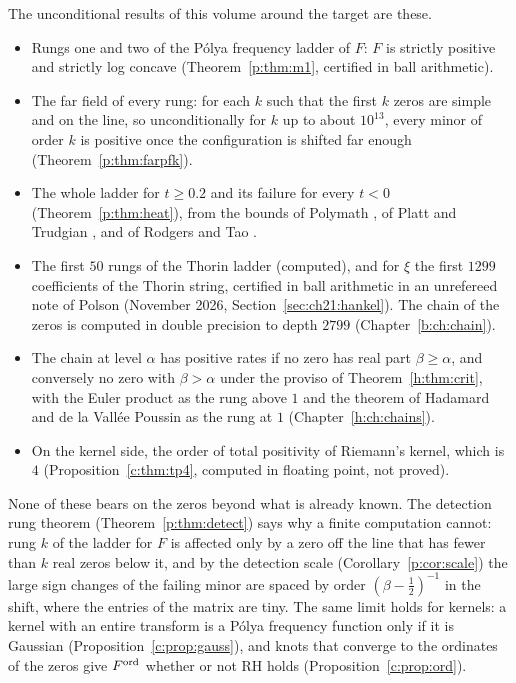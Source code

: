The unconditional results of this volume around the target are these.
\begin{itemize}
\item Rungs one and two of the P\'olya frequency ladder of $F$: $F$ is strictly positive and strictly log concave (Theorem~\ref{p:thm:m1}, certified in ball arithmetic).
\item The far field of every rung: for each $k$ such that the first $k$ zeros are simple and on the line, so unconditionally for $k$ up to about $10^{13}$, every minor of order $k$ is positive once the configuration is shifted far enough (Theorem~\ref{p:thm:farpfk}).
\item The whole ladder for $t\ge0.2$ and its failure for every $t<0$ (Theorem~\ref{p:thm:heat}), from the bounds of Polymath \cite{Polymath}, of Platt and Trudgian \cite{PT21}, and of Rodgers and Tao \cite{RodgersTao}.
\item The first $50$ rungs of the Thorin ladder (computed), and for $\xi$ the first $1299$ coefficients of the Thorin string, certified in ball arithmetic in an unrefereed note of Polson (November 2026, Section~\ref{sec:ch21:hankel}). The chain of the zeros is computed in double precision to depth $2799$ (Chapter~\ref{b:ch:chain}).
\item The chain at level $\alpha$ has positive rates if no zero has real part $\beta\ge\alpha$, and conversely no zero with $\beta>\alpha$ under the proviso of Theorem~\ref{h:thm:crit}, with the Euler product as the rung above $1$ and the theorem of Hadamard and de la Vall\'ee Poussin as the rung at $1$ (Chapter~\ref{h:ch:chains}).
\item On the kernel side, the order of total positivity of Riemann's kernel, which is $4$ (Proposition~\ref{c:thm:tp4}, computed in floating point, not proved).
\end{itemize}
None of these bears on the zeros beyond what is already known. The detection rung theorem (Theorem~\ref{p:thm:detect}) says why a finite computation cannot: rung $k$ of the ladder for $F$ is affected only by a zero off the line that has fewer than $k$ real zeros below it, and by the detection scale (Corollary~\ref{p:cor:scale}) the large sign changes of the failing minor are spaced by order $(\beta-\frac12)^{-1}$ in the shift, where the entries of the matrix are tiny. The same limit holds for kernels: a kernel with an entire transform is a P\'olya frequency function only if it is Gaussian (Proposition~\ref{c:prop:gauss}), and knots that converge to the ordinates of the zeros give $F^{\rm ord}$ whether or not RH holds (Proposition~\ref{c:prop:ord}).

